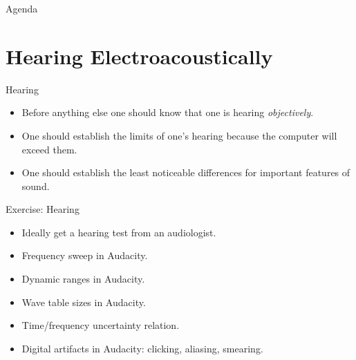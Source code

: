 \documentclass{beamer}
\begin{document}
    \begin{frame}{Agenda}
        \tableofcontents
    \end{frame}
    
    \section{Hearing Electroacoustically}
    
    \begin{frame}{Hearing}
    	\begin{itemize}
	  \item Before anything else one should know that one is hearing \textit{objectively}.
	  \item One should establish the limits of one's hearing because the computer 
	  will exceed them.
	  \item One should establish the least noticeable differences for important features of sound. 
	\end{itemize}
    \end{frame}
    \begin{frame}{Exercise: Hearing}
    	\begin{itemize}
	  \item Ideally get a hearing test from an audiologist.
	  \item Frequency sweep in Audacity.
	  \item Dynamic ranges in Audacity.
	  \item Wave table sizes in Audacity.
	  \item Time/frequency uncertainty relation.
	  \item Digital artifacts in Audacity: clicking, aliasing, smearing.
	\end{itemize}
    \end{frame}
    
\end{document}

